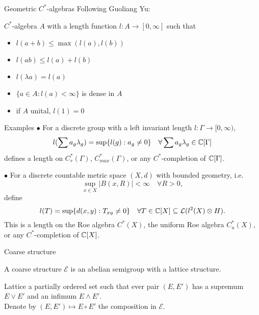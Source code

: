 \begin{frame}{Geometric $C^*$-algebras}
Following Guoliang Yu:
\begin{definition}
$C^*$-algebra $A$ with a length function $l: A \rightarrow [0,\infty]$ such that
\begin{itemize}
\item $l(a+b)\leq \max (l(a), l(b))$
\item $l(ab)\leq l(a)+ l(b)$
\item $l(\lambda a )= l (a)$
\item $\{a\in A : l(a)< \infty\}$ is dense in $A$
\item if $A$ unital, $l(1)=0$
\end{itemize}
\end{definition}
\end{frame}

\begin{frame}{Examples}
$\bullet$ For a discrete group with a left invariant length $l: \Gamma \rightarrow [0,\infty)$, 
\[l(\sum a_g \lambda_g) = \sup \{ l(g) : a_g \neq 0 \} \quad \forall \sum a_g \lambda_g \in \mathbb C [\Gamma]  \]
defines a length on $C_r^*(\Gamma)$, $C_{max}^*(\Gamma)$, or any $C^*$-completion of $\mathbb C [\Gamma]  $.\\

\vspace{0.5in}
 
$\bullet$ For a discrete countable metric space  $(X,d)$ with bounded geometry, i.e. 
\[\sup_{x \in X} |B(x,R)| < \infty \quad \forall R>0 , \]
define
\[l(T) = \sup \{ d(x,y) : T_{xy}\neq 0 \} \quad \forall T\in \mathbb C [X] \subseteq \mathcal L(l^2(X)\otimes H).  \]
This is a length on the Roe algebra $C^*(X)$, the uniform Roe algebra $C_{u}^*(X)$, or any $C^*$-completion of $\mathbb C [X]  $.\\
\end{frame}

\begin{frame}{Coarse structure}
\begin{definitionfr}
A coarse structure $\mathcal E$ is an abelian semigroup with a lattice structure. \\
\end{definitionfr}
\vspace{0.3 cm}
Lattice a partially ordered set such that ever pair $(E,E')$ has a supremum $E\vee E'$ and an infimum $E\wedge E'$.\\
\vspace{0.3 cm}
Denote by $(E,E')\mapsto E\circ E'$ the composition in $\mathcal E$.
\end{frame}

